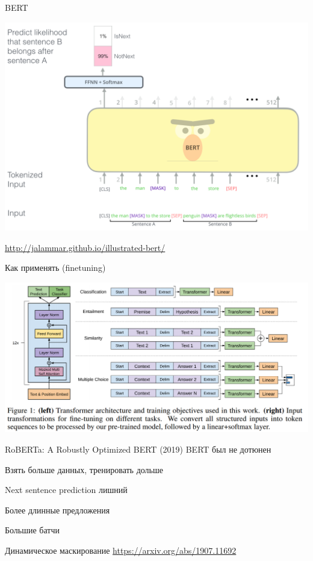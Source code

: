 \documentclass[notes,12pt, aspectratio=169]{beamer}
\newenvironment{wideitemize}{\itemize\addtolength{\itemsep}{10pt}}{\enditemize}
\begin{document}
\begin{frame}{BERT}
		\begin{center}
			\includegraphics[width=0.65\linewidth]{bert_sent}
		\end{center}
		\vfill
		\footnotesize
		{\color{blue} \url{http://jalammar.github.io/illustrated-bert/}}
\end{frame}



\begin{frame}{Как применять (finetuning)}
	\begin{center}
		\includegraphics[width=0.9\linewidth]{images/use_models}
	\end{center}
\end{frame}


\begin{frame}{RoBERTa: A Robustly Optimized BERT (2019)}
	\alert{BERT был не дотюнен}

	\begin{wideitemize}
		\item  Взять больше данных, тренировать дольше
		\item Next sentence prediction лишний
		\item Более длинные предложения
		\item Большие батчи
		\item Динамическое маскирование
	\end{wideitemize}
	\vfill
	\footnotesize
	{\color{blue} \url{https://arxiv.org/abs/1907.11692}}
\end{frame}
\end{document}
